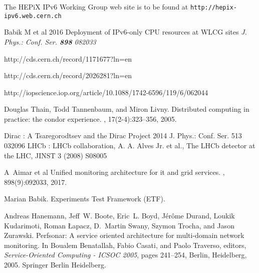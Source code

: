 \begin{thebibliography}{}
%
%


 The HEPiX IPv6 Working Group web site is to be found at {\tt http://hepix-ipv6.web.cern.ch}

Babik M et al 2016 Deployment of IPv6-only CPU resources at WLCG sites {\it J. Phys.: Conf. Ser. {\bf898} 082033}



  http://cds.cern.ch/record/1171677?ln=en

 http://cds.cern.ch/record/2026281?ln=en

http://iopscience.iop.org/article/10.1088/1742-6596/119/6/062044

Douglas Thain, Todd Tannenbaum, and Miron Livny.
\newblock Distributed computing in practice: the condor experience.
, 17(2-4):323--356, 2005.

 Dirac :  A Tsaregorodtsev and the Dirac Project 2014 J. Phys.: Conf.
Ser. 513 032096
LHCb : LHCb collaboration, A. A. Alves Jr. et al., The LHCb detector at
the LHC, JINST 3 (2008) S08005


A~Aimar et al 
\newblock Unified monitoring architecture for it and grid services.
, 898(9):092033, 2017.

Marian Babik.
\newblock Experiments {Test} {Framework} ({ETF}).

Andreas Hanemann, Jeff~W. Boote, Eric~L. Boyd, J{\'e}r{\^o}me Durand, Loukik
  Kudarimoti, Roman {\L}apacz, D.~Martin Swany, Szymon Trocha, and Jason
  Zurawski.
\newblock Perfsonar: A service oriented architecture for multi-domain network
  monitoring.
\newblock In Boualem Benatallah, Fabio Casati, and Paolo Traverso, editors,
  {\em Service-Oriented Computing - ICSOC 2005}, pages 241--254, Berlin,
  Heidelberg, 2005. Springer Berlin Heidelberg.


\end{thebibliography}
